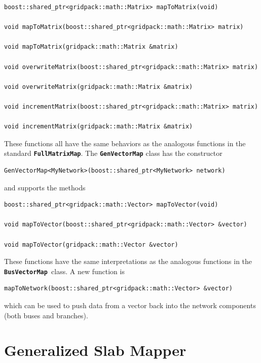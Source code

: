 \documentclass[12pt]{report} %
\begin{document}
{
\color{red}
\begin{Verbatim}[fontseries=b]
boost::shared_ptr<gridpack::math::Matrix> mapToMatrix(void)

void mapToMatrix(boost::shared_ptr<gridpack::math::Matrix> matrix)

void mapToMatrix(gridpack::math::Matrix &matrix)

void overwriteMatrix(boost::shared_ptr<gridpack::math::Matrix> matrix)

void overwriteMatrix(gridpack::math::Matrix &matrix)

void incrementMatrix(boost::shared_ptr<gridpack::math::Matrix> matrix)

void incrementMatrix(gridpack::math::Matrix &matrix)
\end{Verbatim}
}

These functions all have the same behaviors as the analogous functions in the standard \texttt{\textbf{FullMatrixMap}}. The \texttt{\textbf{GenVectorMap}} class has the constructor

{
\color{red}
\begin{Verbatim}[fontseries=b]
GenVectorMap<MyNetwork>(boost::shared_ptr<MyNetwork> network)
\end{Verbatim}
}

and supports the methods

{
\color{red}
\begin{Verbatim}[fontseries=b]
boost::shared_ptr<gridpack::math::Vector> mapToVector(void)

void mapToVector(boost::shared_ptr<gridpack::math::Vector> &vector)

void mapToVector(gridpack::math::Vector &vector)
\end{Verbatim}
}

These functions have the same interpretations as the analogous functions in the \texttt{\textbf{BusVectorMap }}class. A new function is

{
\color{red}
\begin{Verbatim}[fontseries=b]
mapToNetwork(boost::shared_ptr<gridpack::math::Vector> &vector)
\end{Verbatim}
}

which can be used to push data from a vector back into the network components (both buses and branches).

\section{Generalized Slab Mapper}
\end{document}
